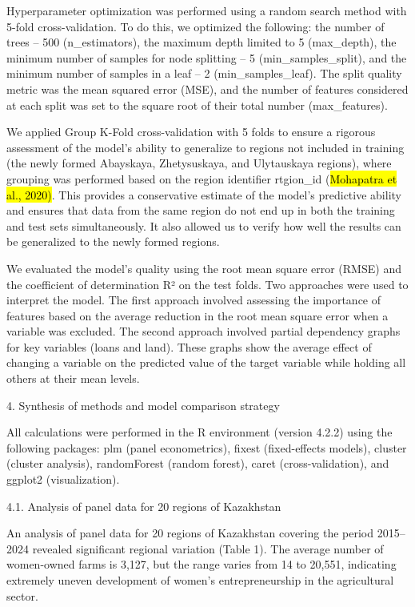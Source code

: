 Hyperparameter optimization was performed using a random search method
with 5-fold cross-validation. To do this, we optimized the following:
the number of trees -- 500 (n\_estimators), the maximum depth limited to
5 (max\_depth), the minimum number of samples for node splitting -- 5
(min\_samples\_split), and the minimum number of samples in a leaf -- 2
(min\_samples\_leaf). The split quality metric was the mean squared
error (MSE), and the number of features considered at each split was set
to the square root of their total number (max\_features).

We applied Group K-Fold cross-validation with 5 folds to ensure a
rigorous assessment of the model's ability to generalize to regions not
included in training (the newly formed Abayskaya, Zhetysuskaya, and
Ulytauskaya regions), where grouping was performed based on the region
identifier rtgion\_id (\hl{Mohapatra et al., 2020)}. This provides a
conservative estimate of the model's predictive ability and ensures that
data from the same region do not end up in both the training and test
sets simultaneously. It also allowed us to verify how well the results
can be generalized to the newly formed regions.

We evaluated the model's quality using the root mean square error (RMSE)
and the coefficient of determination R² on the test folds. Two
approaches were used to interpret the model. The first approach involved
assessing the importance of features based on the average reduction in
the root mean square error when a variable was excluded. The second
approach involved partial dependency graphs for key variables (loans and
land). These graphs show the average effect of changing a variable on
the predicted value of the target variable while holding all others at
their mean levels.

4. Synthesis of methods and model comparison strategy

All calculations were performed in the R environment (version 4.2.2)
using the following packages: plm (panel econometrics), fixest
(fixed-effects models), cluster (cluster analysis), randomForest (random
forest), caret (cross-validation), and ggplot2 (visualization).

4.1. Analysis of panel data for 20 regions of Kazakhstan

An analysis of panel data for 20 regions of Kazakhstan covering the
period 2015--2024 revealed significant regional variation (Table 1). The
average number of women-owned farms is 3,127, but the range varies from
14 to 20,551, indicating extremely uneven development of women's
entrepreneurship in the agricultural sector.

